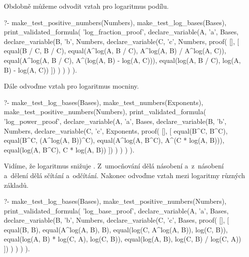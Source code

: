 Obdobně můžeme odvodit vztah pro logaritmus podílu.

\begin{prolog}
?-	make_test_positive_numbers(Numbers),
	make_test_log_bases(Bases),
	print_validated_formula(
		'log_fraction_proof',
		declare_variable(A, 'a', Bases,
			declare_variable(B, 'b', Numbers,
				declare_variable(C, 'c', Numbers,
					proof(
					[],
					[
						equal(B / C, B / C),
						equal(A^log(A, B / C), A^log(A, B) / A^log(A, C)),
						equal(A^log(A, B / C), A^(log(A, B) - log(A, C))),
						equal(log(A, B / C), log(A, B) - log(A, C))
					])
				)
			)
		)
	).				
\end{prolog}

Dále odvoďme vztah pro logaritmus mocniny.

\begin{prolog}
?-	make_test_log_bases(Bases),
	make_test_numbers(Exponents),
	make_test_positive_numbers(Numbers),
	print_validated_formula(
		'log_power_proof',
		declare_variable(A, 'a', Bases,
			declare_variable(B, 'b', Numbers,
				declare_variable(C, 'c', Exponents,
					proof(
					[],
					[
						equal(B^C, B^C),
						equal(B^C, (A^log(A, B))^C),
						equal(A^log(A, B^C), A^(C * log(A, B))),
						equal(log(A, B^C), C * log(A, B))
					])
				)
			)
		)
	).				
\end{prolog}

Vidíme, že logaritmus snižuje . Z~umocňování dělá násobení a~z~násobení a~dělení dělá sčítání a~odčítání. Nakonec odvoďme vztah mezi logaritmy různých základů.

\begin{prolog}
?-	make_test_log_bases(Bases),
	make_test_positive_numbers(Numbers),
	print_validated_formula(
		'log_base_proof',
		declare_variable(A, 'a', Bases,
			declare_variable(B, 'b', Numbers,
				declare_variable(C, 'c', Bases,
					proof(
					[],
					[
						equal(B, B),
						equal(A^log(A, B), B),
						equal(log(C, A^log(A, B)), log(C, B)),
						equal(log(A, B) * log(C, A), log(C, B)),
						equal(log(A, B), log(C, B) / log(C, A))
					])
				)
			)
		)
	).				
\end{prolog}


